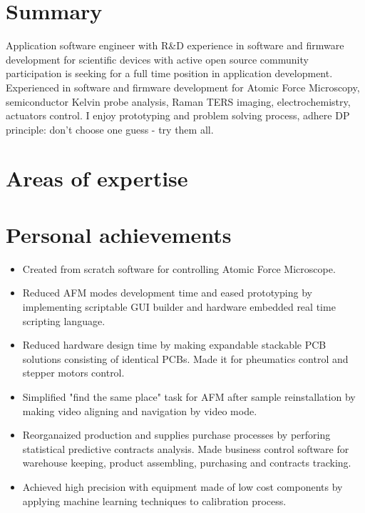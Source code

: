 \documentclass{sb_cv}
\begin{document}
\makecvtitle
\vspace*{-15mm}

\section{Summary}
Application software engineer with R\&D experience in software and firmware development for scientific devices with active open source community participation is seeking for a full time position in application development. Experienced in software and firmware development for Atomic Force Microscopy, semiconductor Kelvin probe analysis, Raman TERS imaging, electrochemistry, actuators control. I enjoy prototyping and problem solving process, adhere DP principle: don't choose one guess - try them all.

\section{Areas of expertise}

\section{Personal achievements}
\begin{itemize}
\item Created from scratch software for controlling Atomic Force Microscope.
\item Reduced AFM modes development time and eased prototyping by implementing scriptable GUI builder and hardware embedded real time scripting language.
\item Reduced hardware design time by making expandable stackable PCB solutions consisting of identical PCBs. Made it for pheumatics control and stepper motors control.
\item Simplified "find the same place" task for AFM after sample reinstallation by making video aligning and navigation by video mode.
\item Reorganaized production and supplies purchase processes by perforing statistical predictive contracts analysis. Made business control software for warehouse keeping, product assembling, purchasing and contracts tracking.
\item Achieved high precision with equipment made of low cost components by applying machine learning techniques to calibration process.
\end{itemize}
\end{document}
